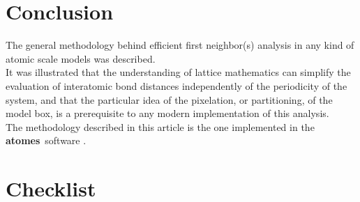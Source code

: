 \documentclass[9pt,tutorial]{livecoms}
\newcommand{\atomes}{{\bf{atomes}}}
\begin{document}
\section{Conclusion}

The general methodology behind efficient first neighbor(s) analysis in any kind of atomic scale models was described. \\
It was illustrated that the understanding of lattice mathematics can simplify the evaluation of interatomic bond distances 
independently of the periodicity of the system, and that the particular idea of the pixelation, or partitioning, of the model box, 
is a prerequisite to any modern implementation of this analysis. \\
The methodology described in this article is the one implemented in the \atomes\ software \cite{CMSatomes}. 

\section*{Checklist}
\end{document}
